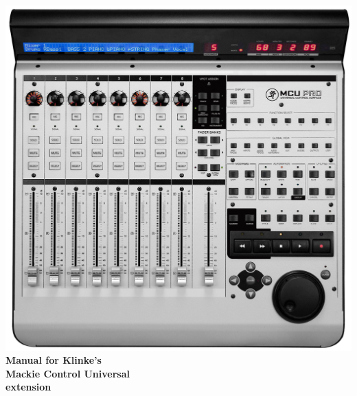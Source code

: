 \begin{center}
\includegraphics[scale=0.33]{./graphs_en/MCU-titlepage.png}
\\[2cm]
{\Huge \bf Manual for Klinke's \\ Mackie Control Universal \\[4mm]
  \reaper extension}
\end{center}
